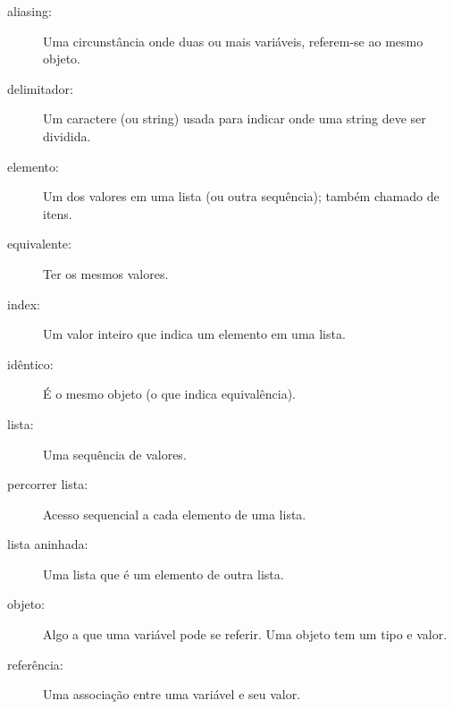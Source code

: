\begin{description}

\item[aliasing:] Uma circunstância onde duas ou mais variáveis, referem-se ao mesmo objeto.

\item[delimitador:] Um caractere (ou string) usada para indicar onde uma string deve ser dividida.

\item[elemento:] Um dos valores em uma lista (ou outra sequência);
também chamado de itens.

\item[equivalente:] Ter os mesmos valores.

\item[index:] Um valor inteiro que indica um elemento em uma lista.

\item[idêntico:] É o mesmo objeto (o que indica equivalência).

\item[lista:] Uma sequência de valores.

\item[percorrer lista:] Acesso sequencial a cada elemento de uma lista.

\item[lista aninhada:] Uma lista que é um elemento de outra lista.

\item[objeto:] Algo a que uma variável pode se referir. Uma objeto tem um tipo e valor.

\item[referência:] Uma associação entre uma variável e seu valor.

\end{description}

